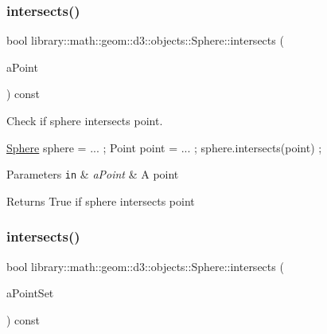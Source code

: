 \subsubsection{\texorpdfstring{intersects()}{intersects()}\hspace{0.1cm}{\footnotesize\ttfamily [1/9]}}
{\footnotesize\ttfamily bool library\+::math\+::geom\+::d3\+::objects\+::\+Sphere\+::intersects (\begin{DoxyParamCaption}\item[{const \hyperlink{classlibrary_1_1math_1_1geom_1_1d3_1_1objects_1_1_point}{Point} \&}]{a\+Point }\end{DoxyParamCaption}) const}



Check if sphere intersects point. 


\begin{DoxyCode}
\hyperlink{classlibrary_1_1math_1_1geom_1_1d3_1_1objects_1_1_sphere_a55dccc8ea16ee55cd7694c26afa8ea39}{Sphere} sphere = ... ;
Point point = ... ;
sphere.intersects(point) ;
\end{DoxyCode}



\begin{DoxyParams}[1]{Parameters}
\mbox{\tt in}  & {\em a\+Point} & A point \\
\hline
\end{DoxyParams}
\begin{DoxyReturn}{Returns}
True if sphere intersects point 
\end{DoxyReturn}
\mbox{\label{classlibrary_1_1math_1_1geom_1_1d3_1_1objects_1_1_sphere_a3b92bc83fc458553437b7e2a50849859}} 
\subsubsection{\texorpdfstring{intersects()}{intersects()}\hspace{0.1cm}{\footnotesize\ttfamily [2/9]}}
{\footnotesize\ttfamily bool library\+::math\+::geom\+::d3\+::objects\+::\+Sphere\+::intersects (\begin{DoxyParamCaption}\item[{const \hyperlink{classlibrary_1_1math_1_1geom_1_1d3_1_1objects_1_1_point_set}{Point\+Set} \&}]{a\+Point\+Set }\end{DoxyParamCaption}) const}



